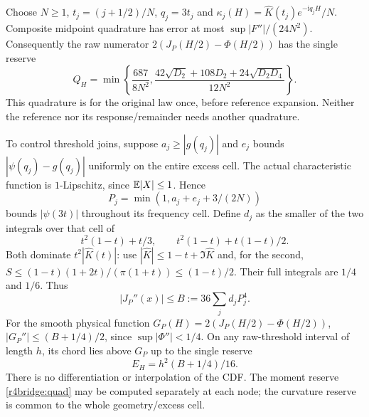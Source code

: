 Choose $N\ge1$, $t_j=(j+1/2)/N$, $q_j=3t_j$ and
$\kappa_j(H)=\widehat K(t_j)e^{-\mathrm iq_jH}/N$.
Composite midpoint quadrature has error at most $\sup|F''|/(24N^2)$.
Consequently the raw numerator $2(J_P(H/2)-\Phi(H/2))$ has the
single reserve
\begin{equation}
 Q_H=\min\left\{\frac{687}{8N^2},
 \frac{42\sqrt{D_2}+108D_2+24\sqrt{D_2D_4}}{12N^2}\right\}.
 \label{r4bridge:quad}
\end{equation}
This quadrature is for the original law once, before reference expansion.
Neither the reference nor its response/remainder needs another quadrature.

To control threshold joins, suppose $a_j\ge|g(q_j)|$ and $e_j$
bounds $|\psi(q_j)-g(q_j)|$ uniformly on the entire excess cell.
The actual characteristic function is $1$-Lipschitz, since
$\mathbb E|X|\le1$. Hence
\[
 P_j=\min(1,a_j+e_j+3/(2N))
\]
bounds $|\psi(3t)|$ throughout its frequency cell. Define $d_j$ as
the smaller of the two integrals over that cell of
\[
 t^2(1-t)+t/3,\qquad t^2(1-t)+t(1-t)/2.
\]
Both dominate $t^2|\widehat K(t)|$: use
$|\widehat K|\le1-t+\Im\widehat K$ and, for the second,
$S\le(1-t)(1+2t)/(\pi(1+t))\le(1-t)/2$.
Their full integrals are $1/4$ and $1/6$. Thus
\[
 |J_P''(x)|\le B:=36\sum_jd_jP_j^4.
\]
For the smooth physical function $G_P(H)=2(J_P(H/2)-\Phi(H/2))$,
$|G_P''|\le(B+1/4)/2$, since $\sup|\Phi''|<1/4$.
On any raw-threshold interval of length $h$, its chord lies above
$G_P$ up to the single reserve
\begin{equation}
 E_H=h^2(B+1/4)/16.\label{r4bridge:H}
\end{equation}
There is no differentiation or interpolation of the CDF. The moment
reserve \eqref{r4bridge:quad} may be computed separately at each node;
the curvature reserve is common to the whole geometry/excess cell.


